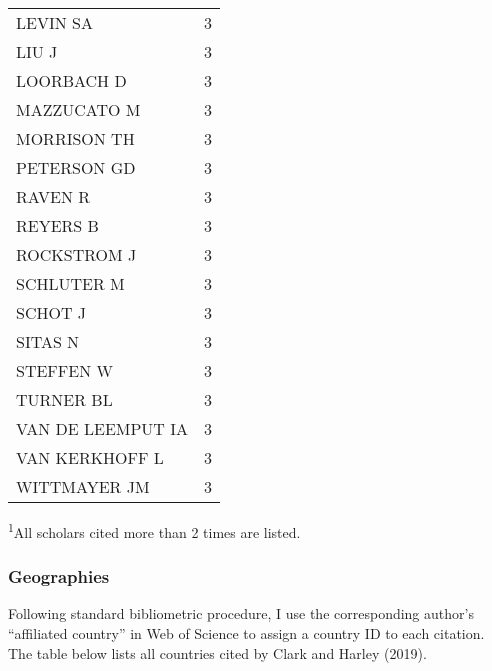 \documentclass[]{article}
\begin{document}
\begin{longtable}{lc}
LEVIN SA & 3 \\ 
LIU J & 3 \\ 
LOORBACH D & 3 \\ 
MAZZUCATO M & 3 \\ 
MORRISON TH & 3 \\ 
PETERSON GD & 3 \\ 
RAVEN R & 3 \\ 
REYERS B & 3 \\ 
ROCKSTROM J & 3 \\ 
SCHLUTER M & 3 \\ 
SCHOT J & 3 \\ 
SITAS N & 3 \\ 
STEFFEN W & 3 \\ 
TURNER BL & 3 \\ 
VAN DE LEEMPUT IA & 3 \\ 
VAN KERKHOFF L & 3 \\ 
WITTMAYER JM & 3 \\ 
\bottomrule
\end{longtable}
\vspace{-5mm}
\begin{minipage}{\linewidth}
\textsuperscript{1}All scholars cited more than 2 times are listed. \\ 
\end{minipage}

\hypertarget{geographies}{%
\subsubsection{Geographies}\label{geographies}}

Following standard bibliometric procedure, I use the corresponding
author's ``affiliated country'' in Web of Science to assign a country ID
to each citation. The table below lists all countries cited by Clark and
Harley (2019). \captionsetup[table]{labelformat=empty,skip=1pt}
\end{document}
